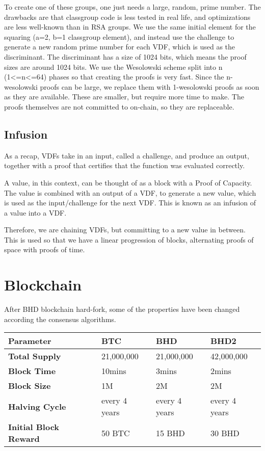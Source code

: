 \begin{flushleft}
    To create one of these groups, one just needs a large, random, prime number. The drawbacks are that classgroup code is less tested in real life, and optimizations are less well-known than in RSA groups. We use the same initial element for the squaring (a=2, b=1 classgroup element), and instead use the challenge to generate a new random prime number for each VDF, which is used as the discriminant. The discriminant has a size of 1024 bits, which means the proof sizes are around 1024 bits. We use the Wesolowski scheme split into n (1<=n<=64) phases so that creating the proofs is very fast. Since the n-wesolowski proofs can be large, we replace them with 1-wesolowski proofs as soon as they are available. These are smaller, but require more time to make. The proofs themselves are not committed to on-chain, so they are replaceable.
\end{flushleft}
\subsection{Infusion}
\begin{flushleft}
    As a recap, VDFs take in an input, called a challenge, and produce an output, together with a proof that certifies that the function was evaluated correctly.
\end{flushleft}
\begin{flushleft}
    A value, in this context, can be thought of as a block with a Proof of Capacity. The value is combined with an output of a VDF, to generate a new value, which is used as the input/challenge for the next VDF. This is known as an infusion of a value into a VDF.
\end{flushleft}
\begin{flushleft}
    Therefore, we are chaining VDFs, but committing to a new value in between. This is used so that we have a linear progression of blocks, alternating proofs of space with proofs of time.
\end{flushleft}
\section{Blockchain}
\begin{flushleft}
    After BHD blockchain hard-fork, some of the properties have been changed according the consensus algorithms.
\end{flushleft}
\begin{tabular}{ p{4cm} p{2.5cm} p{2.5cm} p{2.5cm}  }
    \hline
    \rowcolor{lightgray} \textbf{Parameter} & \textbf{BTC} & \textbf{BHD} & \textbf{BHD2} \\[5pt]
    \hline
    \textbf{Total Supply} & 21,000,000 & 21,000,000 & 42,000,000 \\[5pt]
    \rowcolor{lightgray!30} \textbf{Block Time} & 10mins & 3mins & 2mins \\[5pt]
    \textbf{Block Size} & 1M & 2M & 2M \\[5pt]
    \rowcolor{lightgray!30} \textbf{Halving Cycle} & every 4 years & every 4 years & every 4 years \\[5pt]
    \textbf{Initial Block Reward} & 50 BTC & 15 BHD & 30 BHD \\[5pt]
    \hline
\end{tabular}
